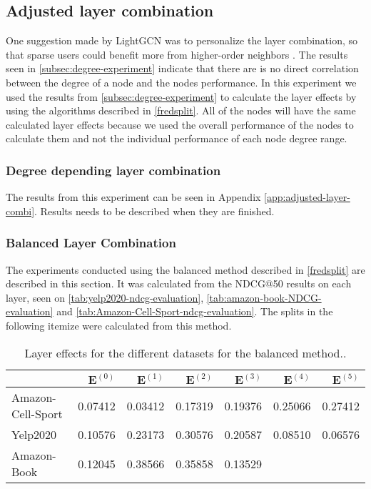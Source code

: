 \subsection{Adjusted layer combination}\label{subsec:adjusted-layer-combination}
One suggestion made by LightGCN was to personalize the layer combination, so that sparse users could benefit more from higher-order neighbors \cite{lightgcn}.
The results seen in \autoref{subsec:degree-experiment} indicate that there are is no direct correlation between the degree of a node and the nodes performance.
In this experiment we used the results from \autoref{subsec:degree-experiment} to calculate the layer effects by using the algorithms described in \autoref{fredsplit}.
All of the nodes will have the same calculated layer effects because we used the overall performance of the nodes to calculate them and not the individual performance of each node degree range.

\subsubsection{Degree depending layer combination}
The results from this experiment can be seen in Appendix \ref{app:adjusted-layer-combi}.
Results needs to be described when they are finished.

\subsubsection{Balanced Layer Combination}
The experiments conducted using the balanced method described in \autoref{fredsplit} are described in this section.
It was calculated from the NDCG@50 results on each layer, seen on \autoref{tab:yelp2020-ndcg-evaluation}, \autoref{tab:amazon-book-NDCG-evaluation} and \autoref{tab:Amazon-Cell-Sport-ndcg-evaluation}.
The splits in the following itemize were calculated from this method.
\begin{table*}[]
    \centering
    \begin{tabular}{|l|r|r|r|r|r|r|}
        \hline
                          & $\mathbf{E}^{(0)}$ & $\mathbf{E}^{(1)}$ & $\mathbf{E}^{(2)}$ & $\mathbf{E}^{(3)}$ & $\mathbf{E}^{(4)}$ & $\mathbf{E}^{(5)}$ \\ \hline
        Amazon-Cell-Sport & 0.07412            & 0.03412            & 0.17319            & 0.19376            & 0.25066            & 0.27412            \\ \hline
        Yelp2020          & 0.10576            & 0.23173            & 0.30576            & 0.20587            & 0.08510            & 0.06576            \\ \hline
        Amazon-Book       & 0.12045            & 0.38566            & 0.35858            & 0.13529            &                    &                    \\ \hline
    \end{tabular}
    \caption{Layer effects for the different datasets for the balanced method..}
    \label{tab:layer-effect}
\end{table*}

